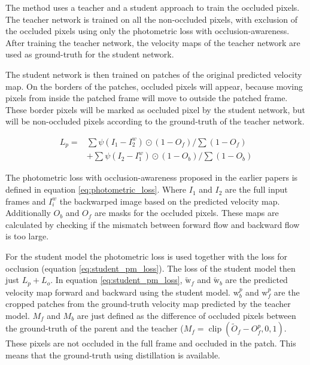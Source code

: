 The method uses a teacher and a student approach to train the occluded pixels. The teacher network is trained on all the non-occluded pixels, with exclusion of the occluded pixels using only the photometric loss with occlusion-awareness. After training the teacher network, the velocity maps of the teacher network are used as ground-truth for the student network.

The student network is then trained on patches of the original predicted velocity map. On the borders of the patches, occluded pixels will appear, because moving pixels from inside the patched frame will move to outside the patched frame. These border pixels will be marked as occluded pixel by the student network, but will be non-occluded pixels according to the ground-truth of the teacher network.

\begin{equation}
\begin{aligned}
L_{p}=& \sum \psi\left(I_{1}-I_{2}^{w}\right) \odot\left(1-O_{f}\right) / \sum\left(1-O_{f}\right) \\
&+\sum \psi\left(I_{2}-I_{1}^{w}\right) \odot\left(1-O_{b}\right) / \sum\left(1-O_{b}\right)
\end{aligned}
\label{eq:photometric_loss}
\end{equation}

The photometric loss \cite{Yu2016} with occlusion-awareness \cite{Janai2018} proposed in the earlier papers is defined in equation \ref{eq:photometric_loss}. Where $I_1$ and $I_2$ are the full input frames and $I_i^w$ the backwarped image based on the predicted velocity map. Additionally $O_b$ and $O_f$ are masks for the occluded pixels. These maps are calculated by checking if the mismatch between forward flow and backward flow is too large.


For the student model the photometric loss is used together with the loss for occlusion (equation \ref{eq:student_pm_loss}). The loss of the student model then just $L_p+L_o$. In equation \ref{eq:student_pm_loss}, $\widetilde{\mathrm{w}}_{f}$ and $\widetilde{\mathrm{w}}_{b}$ are the predicted velocity map forward and backward using the student model. $\mathrm{w}_{b}^{p}$ and $\mathrm{w}_{f}^{p}$ are the cropped patches from the ground-truth velocity map predicted by the teacher model. $M_f$ and $M_b$ are just defined as the difference of occluded pixels between the ground-truth of the parent and the teacher ($M_{f}=\operatorname{clip}\left(\widetilde{O}_{f}-O_{f}^{p}, 0,1\right)$. These pixels are not occluded in the full frame and occluded in the patch. This means that the ground-truth using distillation is available.

